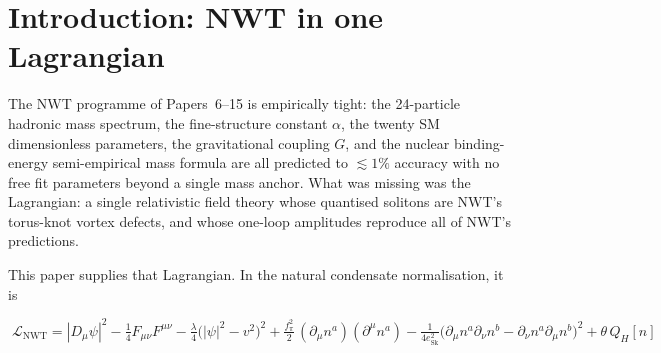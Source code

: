 \documentclass[11pt]{article}
\newcommand{\Lnwt}{\mathcal{L}_\text{NWT}}
\begin{document}
\begin{abstract}
A natural UV completion to a $\mathrm{SO}(10)$ gauge theory at
$E_\text{GUT} = 7.41 \times 10^{15}$~GeV adds 33 heavy gauge bosons
and yields three concrete falsifiable predictions:
proton lifetime $\tau(p \to e^+ \pi^0) \sim 1.4 \times 10^{35}$~yr
within Hyper-Kamiokande / DUNE reach, non-MSSM coupling unification
at $\alpha_\text{GUT} = 1/40$, and a stochastic
gravitational-wave signature near $7.4$~GHz from the
$\mathrm{SO}(10) \to \text{SM}$ phase transition.

A first-principles one-loop Casimir calculation on $S^3/2I$ in
the BPS trefoil background (\S\ref{sec:open}, Phases $0$--$5$)
produces the $\mathcal{O}(1)$ coefficient expected for the Seeley
$a_2$ piece of the effective action: $\Delta(1/16\pi G) \approx
0.27\,m_e^2$ in natural units.  This result \emph{localises} the
$\alpha^{-21}$ suppression of $G$: it is not present in the
Seeley coefficient and must therefore enter through the
Wilson-line amplitude in the matter-to-gauge transition channel,
as proposed in Paper~15 \S7.2.  This is a structural localisation,
not a numerical derivation; rigorous evaluation of the Wilson
amplitude on the 21-edge $K_7$ Eulerian circuit is concrete,
well-defined, and deferred to a follow-up paper.
\end{abstract}

\tableofcontents

\section{Introduction: NWT in one Lagrangian}
\label{sec:intro}

The NWT programme of Papers~6--15 is empirically tight: the 24-particle
hadronic mass spectrum, the fine-structure constant $\alpha$, the
twenty SM dimensionless parameters, the gravitational coupling $G$,
and the nuclear binding-energy semi-empirical mass formula are all
predicted to $\lesssim 1\%$ accuracy with no free fit parameters
beyond a single mass anchor.  What was missing was the
Lagrangian: a single relativistic field theory whose quantised
solitons are NWT's torus-knot vortex defects, and whose one-loop
amplitudes reproduce all of NWT's predictions.

This paper supplies that Lagrangian.  In the natural condensate
normalisation, it is

\begin{equation}
\label{eq:LNWT-master}
  \boxed{\;
    \Lnwt
    =  |D_\mu \psi|^2  -  \tfrac{1}{4} F_{\mu\nu} F^{\mu\nu}
    -  \tfrac{\lambda}{4}\bigl(|\psi|^2 - v^2\bigr)^2
    +  \tfrac{f_\pi^2}{2}\,(\partial_\mu n^a)(\partial^\mu n^a)
    -  \tfrac{1}{4 e_\text{Sk}^2}
       \bigl(\partial_\mu n^a \partial_\nu n^b
              - \partial_\nu n^a \partial_\mu n^b\bigr)^2
    +  \theta\,Q_H[n]
  \;}
\end{equation}
\end{document}
